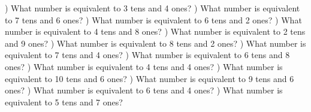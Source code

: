 \documentclass{article}%
\begin{document}
\newline%
) What number is equivalent to 3 tens and 4 ones?%
\newline%
\newline%
) What number is equivalent to 7 tens and 6 ones?%
\newline%
\newline%
) What number is equivalent to 6 tens and 2 ones?%
\newline%
\newline%
) What number is equivalent to 4 tens and 8 ones?%
\newline%
\newline%
) What number is equivalent to 2 tens and 9 ones?%
\newline%
\newline%
) What number is equivalent to 8 tens and 2 ones?%
\newline%
\newline%
) What number is equivalent to 7 tens and 4 ones?%
\newline%
\newline%
) What number is equivalent to 6 tens and 8 ones?%
\newline%
\newline%
) What number is equivalent to 4 tens and 4 ones?%
\newline%
\newline%
) What number is equivalent to 10 tens and 6 ones?%
\newline%
\newline%
) What number is equivalent to 9 tens and 6 ones?%
\newline%
\newline%
) What number is equivalent to 6 tens and 4 ones?%
\newline%
\newline%
) What number is equivalent to 5 tens and 7 ones?%
\newline%
\end{document}
